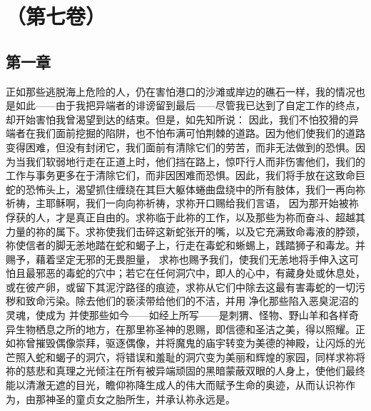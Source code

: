 

\section{（第七卷）}


\subsection{第一章}

\par

正如那些逃脱海上危险的人，仍在害怕港口的沙滩或岸边的礁石一样，我的情况也是如此——由于我把异端者的诽谤留到最后——尽管我已达到了自定工作的终点，却开始害怕我曾渴望到达的结束。但是，如先知所说： 因此，我们不怕狡猾的异端者在我们面前挖掘的陷阱，也不怕布满可怕荆棘的道路。因为他们使我们的道路变得困难，但没有封闭它，我们面前有清除它们的劳苦，而非无法做到的恐惧。因为当我们软弱地行走在正道上时，他们挡在路上，惊吓行人而非伤害他们，我们的工作与事务更多在于清除它们，而非因困难而恐惧。因此，我们将手放在这致命巨蛇的恐怖头上，渴望抓住缠绕在其巨大躯体蜷曲盘绕中的所有肢体，我们一再向祢祈祷，主耶稣啊，我们一向向祢祈祷，求祢开口赐给我们言语，  因为那开始被祢俘获的人，才是真正自由的。求祢临于此祢的工作，以及那些为祢而奋斗、超越其力量的祢的属下。求祢使我们击碎这新蛇张开的嘴，以及它充满致命毒液的脖颈，祢使信者的脚无恙地踏在蛇和蝎子上，行走在毒蛇和蜥蜴上，践踏狮子和毒龙。并赐予，藉着坚定无邪的无畏胆量， 求祢也赐予我们，使我们无恙地将手伸入这可怕且最邪恶的毒蛇的穴中；若它在任何洞穴中，即人的心中，有藏身处或休息处，或在彼产卵，或留下其泥泞路径的痕迹，求祢从它们中除去这最有害毒蛇的一切污秽和致命污染。除去他们的亵渎带给他们的不洁，并用 净化那些陷入恶臭泥沼的灵魂，使成为  并使那些如今——如经上所写——是刺猬、怪物、野山羊和各样奇异生物栖息之所的地方，在那里祢圣神的恩赐，即信德和圣洁之美，得以照耀。正如祢曾摧毁偶像崇拜，驱逐偶像，并将魔鬼的庙宇转变为美德的神殿，让闪烁的光芒照入蛇和蝎子的洞穴，将错误和羞耻的洞穴变为美丽和辉煌的家园，同样求祢将祢的慈悲和真理之光倾注在所有被异端顽固的黑暗蒙蔽双眼的人身上，使他们最终能以清澈无遮的目光，瞻仰祢降生成人的伟大而赋予生命的奥迹，从而认识祢作为，由那神圣的童贞女之胎所生，并承认祢永远是。\par

